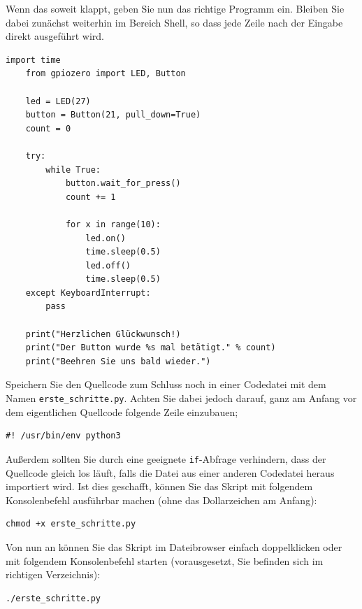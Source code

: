 \bigskip
\teilaufgabe
Wenn das soweit klappt, geben Sie nun das richtige Programm ein. Bleiben Sie
dabei zunächst weiterhin im Bereich \glqq{}Shell\grqq{}, so dass jede Zeile
nach der Eingabe direkt ausgeführt wird.

\begin{Verbatim}[gobble=4]
    import time
    from gpiozero import LED, Button

    led = LED(27)
    button = Button(21, pull_down=True)
    count = 0

    try:
        while True:
            button.wait_for_press()
            count += 1

            for x in range(10):
                led.on()
                time.sleep(0.5)
                led.off()
                time.sleep(0.5)
    except KeyboardInterrupt:
        pass

    print("Herzlichen Glückwunsch!)
    print("Der Button wurde %s mal betätigt." % count)
    print("Beehren Sie uns bald wieder.")
\end{Verbatim}

\bigskip
\teilaufgabe
Speichern Sie den Quellcode zum Schluss noch in einer Codedatei mit dem Namen
\texttt{erste\_schritte.py}. Achten Sie dabei jedoch darauf, ganz am Anfang vor
dem eigentlichen Quellcode folgende Zeile einzubauen;

\begin{Verbatim}[gobble=4]
    #! /usr/bin/env python3
\end{Verbatim}

Außerdem sollten Sie durch eine geeignete \texttt{if}-Abfrage verhindern, dass
der Quellcode gleich los läuft, falls die Datei aus einer anderen Codedatei
heraus importiert wird. Ist dies geschafft, können Sie das Skript mit folgendem
Konsolenbefehl ausführbar machen (ohne das Dollarzeichen am Anfang):

\begin{Verbatim}[gobble=4]
    chmod +x erste_schritte.py
\end{Verbatim}

Von nun an können Sie das Skript im Dateibrowser einfach doppelklicken oder
mit folgendem Konsolenbefehl starten (vorausgesetzt, Sie befinden sich im
richtigen Verzeichnis):

\begin{Verbatim}[gobble=4]
    ./erste_schritte.py
\end{Verbatim}

\clearpage


